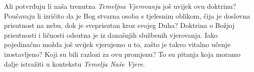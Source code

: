 Ali potvrđuju li naša trenutna \textit{Temeljna Vjerovanja} još uvijek ovu doktrinu? Poučavaju li izričito da je Bog stvarna osoba s tjelesnim oblikom, čija je doslovna prisutnost na nebu, dok je sveprisutan kroz svojeg Duha? Doktrina o Božjoj prisutnosti i ličnosti odsutna je iz današnjih službenih vjerovanja. Iako pojedinačno možda još uvijek vjerujemo u to, zašto je takvo vitalno učenje izostavljeno? Koji su bili razlozi za ovu promjenu? To su pitanja koja moramo dalje istražiti u kontekstu \textit{Temelja Naše Vjere}.

